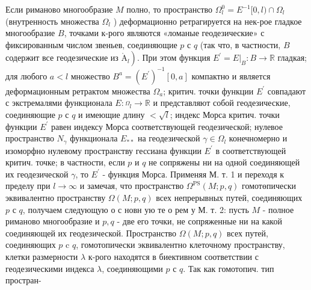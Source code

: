 \documentclass[10pt]{article}
\def\AA{\mathring{\mathrm{A}}}
\begin{document}
Если риманово многообразие $M$ полно, то пространство $\Omega_{l}^{0}=E^{-1}[0, l) \cap \Omega_{l}$ (внутренность множества $\Omega_{l}$ ) деформационно ретрагируется на нек-рое гладкое многообразие $B$, точками к-рого являются «ломаные геодезические» с фиксированным числом звеньев, соединяющие $p$ с $q$ (так что, в частности, $B$ содержит все геодезические из $\left.\AA_{l}\right)$. При этом функция $E^{\prime}=\left.E\right|_{B}: B \rightarrow \mathbb{R}$ гладкая; для любого $a<l$ множество $B^{a}=\left(E^{\prime}\right)^{-1}[0, a]$ компактно и является деформационным ретрактом множества $\Omega_{a}$; критич. точки функции $E^{\prime}$ совпадают с экстремалями функционала $E: \stackrel{\Omega}{ }_{l} \rightarrow \mathbb{R}$ и представляют собой геодезические, соединяющие $p$ с $q$ и имеющие длину $<\sqrt{l}$; индекс Морса критич. точки функции $E^{\prime}$ равен индексу Морса соответствующей геодезической; нулевое пространство $N_{\gamma}$ функционала $E_{* *}$ на геодезической $\gamma \in \Omega_{l}$ конечномерно и изоморфно нулевому пространству гессиана функции $E^{\prime}$ в соответствующей критич. точке; в частности, если $p$ и $q$ не сопряжены ни на одной соединяющей их геодезической $\gamma$, то $E^{\prime}$ - функция Морса. Применяя М. т. 1 и переходя к пределу при $l \rightarrow \infty$ и замечая, что пространство $\Omega^{\mathrm{PS}}(M ; p, q)$ гомотөпически эквивалентно пространству $\Omega(M ; p, q)$ всех непрерывных путей, соединяющих $p$ с $q$, получаем следующую о с новн ую те о рем у М. т. 2: пусть $M$ - полное риманово многообразие и $p, q$ - две его точки, не сопряженные ни на какой соединяющей их геодезической. Пространство $\Omega(M ; p, q)$ всех путей, соединяющих $p$ c $q$, гомотопически эквивалентно клеточному пространству, клетки размерности $\lambda$ к-рого находятся в биективном соответствии с геодезическими индекса $\lambda$, соединяющими $p$ с $q$. Так как гомотопич. тип простран-
\end{document}
